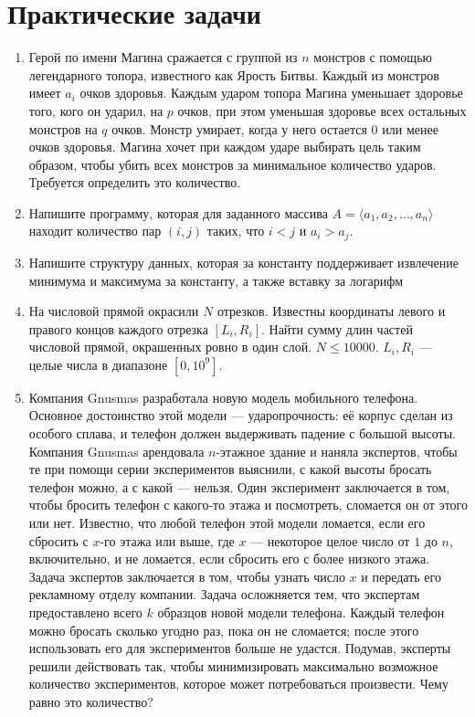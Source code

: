 \documentclass[a4paper, 12pt]{article}
\begin{document}
  \section*{Практические задачи}
  \begin{enumerate}
    \item Герой по имени Магина сражается с группой из $n$ монстров с помощью легендарного топора, известного как Ярость Битвы. Каждый из монстров имеет $a_i$ очков здоровья. Каждым ударом топора Магина уменьшает здоровье того, кого он ударил, на $p$ очков, при этом уменьшая здоровье всех остальных монстров на $q$ очков. Монстр умирает, когда у него остается $0$ или менее очков здоровья. Магина хочет при каждом ударе выбирать цель таким образом, чтобы убить всех монстров за минимальное количество ударов. Требуется определить это количество.
    \item Напишите программу, которая для заданного массива $A=\langle a_1, a_2,\dots,a_n\rangle$ находит количество пар $(i,j)$ таких, что $i<j$ и $a_i>a_j$.
    \item Напишите структуру данных, которая за константу поддерживает извлечение минимума и максимума за константу, а также вставку за логарифм
    \item На числовой прямой окрасили $N$ отрезков. Известны координаты левого и правого концов каждого отрезка $[L_i,R_i]$. Найти сумму длин частей числовой прямой, окрашенных ровно в один слой. $N\le10000$. $L_i,R_i$ --- целые числа в диапазоне $[0,10^9]$.
    \item Компания Gnusmas разработала новую модель мобильного телефона. Основное достоинство этой модели --- ударопрочность: её корпус сделан из особого сплава, и телефон должен выдерживать падение с большой высоты. Компания Gnusmas арендовала $n$-этажное здание и наняла экспертов, чтобы те при помощи серии экспериментов выяснили, с какой высоты бросать телефон можно, а с какой --- нельзя. Один эксперимент заключается в том, чтобы бросить телефон с какого-то этажа и посмотреть, сломается он от этого или нет. Известно, что любой телефон этой модели ломается, если его сбросить с $x$-го этажа или выше, где $x$ --- некоторое целое число от $1$ до $n$, включительно, и не ломается, если сбросить его с более низкого этажа. Задача экспертов заключается в том, чтобы узнать число $x$ и передать его рекламному отделу компании. Задача осложняется тем, что экспертам предоставлено всего $k$ образцов новой модели телефона. Каждый телефон можно бросать сколько угодно раз, пока он не сломается; после этого использовать его для экспериментов больше не удастся. Подумав, эксперты решили действовать так, чтобы минимизировать максимально возможное количество экспериментов, которое может потребоваться произвести. Чему равно это количество?

\end{enumerate}
\end{document}
